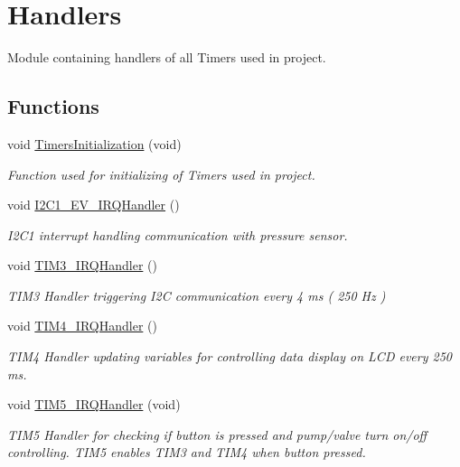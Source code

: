 \hypertarget{group___handlers}{}\section{Handlers}
\label{group___handlers}


Module containing handlers of all Timers used in project.  


\subsection*{Functions}
\begin{DoxyCompactItemize}
\item 
void \mbox{\hyperlink{group___handlers_ga8811e30ebd5ea09370ba3796b69a5c6a_ga8811e30ebd5ea09370ba3796b69a5c6a}{Timers\+Initialization}} (void)
\begin{DoxyCompactList}\small\item\em Function used for initializing of Timers used in project. \end{DoxyCompactList}\item 
void \mbox{\hyperlink{group___handlers_gad0e17b57fe51ed2861178f06899345c0_gad0e17b57fe51ed2861178f06899345c0}{I2\+C1\+\_\+\+E\+V\+\_\+\+I\+R\+Q\+Handler}} ()
\begin{DoxyCompactList}\small\item\em I2\+C1 interrupt handling communication with pressure sensor. \end{DoxyCompactList}\item 
void \mbox{\hyperlink{group___handlers_ga2f59315000eb73fdeac2ab44fcd8b972_ga2f59315000eb73fdeac2ab44fcd8b972}{T\+I\+M3\+\_\+\+I\+R\+Q\+Handler}} ()
\begin{DoxyCompactList}\small\item\em T\+I\+M3 Handler triggering I2C communication every 4 ms ( 250 Hz ) \end{DoxyCompactList}\item 
void \mbox{\hyperlink{group___handlers_ga6e7703924e97aa04dbae6b88adcec3d1_ga6e7703924e97aa04dbae6b88adcec3d1}{T\+I\+M4\+\_\+\+I\+R\+Q\+Handler}} ()
\begin{DoxyCompactList}\small\item\em T\+I\+M4 Handler updating variables for controlling data display on L\+CD every 250 ms. \end{DoxyCompactList}\item 
void \mbox{\hyperlink{group___handlers_ga5e66446caf21dd90191dc07a13ce2378_ga5e66446caf21dd90191dc07a13ce2378}{T\+I\+M5\+\_\+\+I\+R\+Q\+Handler}} (void)
\begin{DoxyCompactList}\small\item\em T\+I\+M5 Handler for checking if button is pressed and pump/valve turn on/off controlling. T\+I\+M5 enables T\+I\+M3 and T\+I\+M4 when button pressed. \end{DoxyCompactList}\end{DoxyCompactItemize}
